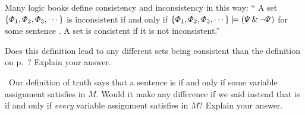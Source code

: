 \problempart
\label{pr.SemanticsEssay}
\begin{earg}
\item Many logic books define consistency and inconsistency in this way:
`` A set $\{\varPhi{}_1,\varPhi{}_2,\varPhi{}_3,\cdots\}$ is inconsistent if and only if $\{\varPhi{}_1,\varPhi{}_2,\varPhi{}_3,\cdots\}\models(\varPsi{}\,\&\,\neg\varPsi{})$ for some sentence \metaB{}. A set is consistent if it is not inconsistent.''

Does this definition lead to any different sets being consistent than the definition on  p.~\pageref{def.consistencySL}? Explain your answer.

\item\leftsolutions\ Our definition of truth says that a sentence \metaA{} is   if and only if some variable assignment satisfies \metaA{} in $M$. Would it make any difference if we said instead that \metaA{} is   if and only if \emph{every} variable assignment satisfies \metaA{} in $M$? Explain your answer.
\end{earg}

